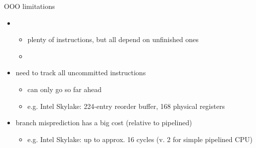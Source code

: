 \begin{frame}{OOO limitations}
    \begin{itemize}
        \item {}
            \begin{itemize}
            \item plenty of instructions, but all depend on unfinished ones
            \item {}
            \end{itemize}
        \item need to track all uncommitted instructions
            \begin{itemize}
            \item can only go so far ahead
            \item e.g. Intel Skylake: 224-entry reorder buffer, 168 physical registers
            \end{itemize}
        \item branch misprediction has a big cost (relative to pipelined)
            \begin{itemize}
            \item e.g. Intel Skylake: up to approx. 16 cycles (v. 2 for simple pipelined CPU)
            \end{itemize}
    \end{itemize}
\end{frame}
